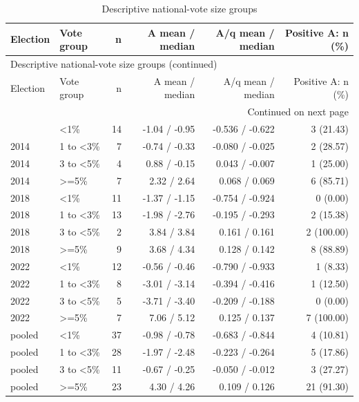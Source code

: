 \begingroup
\scriptsize
\setlength{\tabcolsep}{3.2pt}
\begin{longtable}{llrrrr}
\caption{Descriptive national-vote size groups}\label{tab:report-party-size-bins} \\
\toprule
Election & Vote group & n & A mean / median & A/q mean / median & Positive A: n (\%) \\
\midrule
\endfirsthead
\multicolumn{6}{l}{\footnotesize Descriptive national-vote size groups (continued)} \\
\toprule
Election & Vote group & n & A mean / median & A/q mean / median & Positive A: n (\%) \\
\midrule
\endhead
\midrule
\multicolumn{6}{r}{\footnotesize Continued on next page} \\
\endfoot
\bottomrule
\endlastfoot
2014 & <1\% & 14 & -1.04 / -0.95 & -0.536 / -0.622 & 3 (21.43) \\
2014 & 1 to <3\% & 7 & -0.74 / -0.33 & -0.080 / -0.025 & 2 (28.57) \\
2014 & 3 to <5\% & 4 & 0.88 / -0.15 & 0.043 / -0.007 & 1 (25.00) \\
2014 & >=5\% & 7 & 2.32 / 2.64 & 0.068 / 0.069 & 6 (85.71) \\
2018 & <1\% & 11 & -1.37 / -1.15 & -0.754 / -0.924 & 0 (0.00) \\
2018 & 1 to <3\% & 13 & -1.98 / -2.76 & -0.195 / -0.293 & 2 (15.38) \\
2018 & 3 to <5\% & 2 & 3.84 / 3.84 & 0.161 / 0.161 & 2 (100.00) \\
2018 & >=5\% & 9 & 3.68 / 4.34 & 0.128 / 0.142 & 8 (88.89) \\
2022 & <1\% & 12 & -0.56 / -0.46 & -0.790 / -0.933 & 1 (8.33) \\
2022 & 1 to <3\% & 8 & -3.01 / -3.14 & -0.394 / -0.416 & 1 (12.50) \\
2022 & 3 to <5\% & 5 & -3.71 / -3.40 & -0.209 / -0.188 & 0 (0.00) \\
2022 & >=5\% & 7 & 7.06 / 5.12 & 0.125 / 0.137 & 7 (100.00) \\
pooled & <1\% & 37 & -0.98 / -0.78 & -0.683 / -0.844 & 4 (10.81) \\
pooled & 1 to <3\% & 28 & -1.97 / -2.48 & -0.223 / -0.264 & 5 (17.86) \\
pooled & 3 to <5\% & 11 & -0.67 / -0.25 & -0.050 / -0.012 & 3 (27.27) \\
pooled & >=5\% & 23 & 4.30 / 4.26 & 0.109 / 0.126 & 21 (91.30) \\
\end{longtable}
\endgroup

